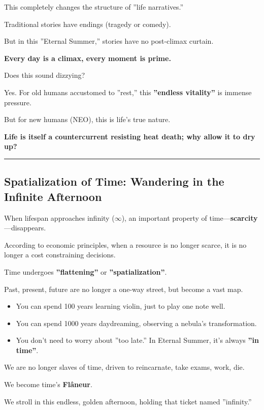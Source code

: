 This completely changes the structure of ''life narratives.''

Traditional stories have endings (tragedy or comedy).

But in this ''Eternal Summer,'' stories have no post-climax curtain.

\textbf{Every day is a climax, every moment is prime.}

Does this sound dizzying?

Yes. For old humans accustomed to ''rest,'' this \textbf{''endless vitality''} is immense pressure.

But for new humans (NEO), this is life's true nature.

\textbf{Life is itself a countercurrent resisting heat death; why allow it to dry up?}

\hrule

\subsection{Spatialization of Time: Wandering in the Infinite Afternoon}

When lifespan approaches infinity ($\infty$), an important property of time---\textbf{scarcity}---disappears.

According to economic principles, when a resource is no longer scarce, it is no longer a cost constraining decisions.

Time undergoes \textbf{''flattening''} or \textbf{''spatialization''}.

Past, present, future are no longer a one-way street, but become a vast map.

\begin{itemize}
\item You can spend 100 years learning violin, just to play one note well.

\item You can spend 1000 years daydreaming, observing a nebula's transformation.

\item You don't need to worry about ''too late.'' In Eternal Summer, it's always \textbf{''in time''}.
\end{itemize}

We are no longer slaves of time, driven to reincarnate, take exams, work, die.

We become time's \textbf{Flâneur}.

We stroll in this endless, golden afternoon, holding that ticket named ''infinity.''

